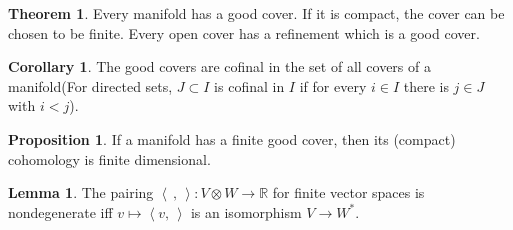 \documentclass[twocolumn]{article}
\theoremstyle{definition}
\newtheorem{theorem}[definition]{Theorem}
\newtheorem{lemma}[definition]{Lemma}
\newtheorem{proposition}[definition]{Proposition}
\newtheorem{corollary}[definition]{Corollary}
\theoremstyle{remark}
\begin{document}
\begin{theorem}
    Every manifold has a good cover. If it is compact, the cover can be chosen to be finite.
    Every open cover has a refinement which is a good cover.
\end{theorem}
\begin{corollary}
    The good covers are cofinal in the set of all covers of a manifold(For directed sets, $J \subset I$ is cofinal in $I$ if for every $i\in I$ there is $j\in J$ with $i<j$).
\end{corollary}
\begin{proposition}
    If a manifold has a finite good cover, then its (compact) cohomology is finite dimensional.
\end{proposition}
\begin{lemma}
    The pairing $\left\langle \,,\,\right\rangle : V \otimes  W \rightarrow \mathbb{R}$ for finite vector spaces is nondegenerate iff $v \mapsto\left\langle v,\,  \right\rangle$ is an isomorphism $V\rightarrow W^*$.
\end{lemma}
\end{document}
